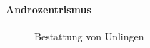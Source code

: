 \documentclass[
  letterpaper,
  DIV=11,
  numbers=noendperiod]{scrartcl}
\let\oldparagraph\paragraph
\renewcommand{\paragraph}[1]{\oldparagraph{#1}\mbox{}}
\begin{document}
\paragraph{Androzentrismus}\label{androzentrismus}

\begin{figure}


\caption{\label{fig-bestattung-von-unlingen}Bestattung von Unlingen}

\end{figure}%
\end{document}
